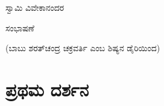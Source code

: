 

\centerline{
{\Large ಸ್ವಾಮಿ ವಿವೇಕಾನಂದರ}
}

\centerline{
{\Large ಸಂಭಾಷಣೆ}
}

\centerline{
{\Large (ಬಾಬು ಶರತ್‌ಚಂದ್ರ ಚಕ್ರವರ್ತಿ ಎಂಬ ಶಿಷ್ಯನ ಡೈರಿಯಿಂದ)}
}

\part{ಪ್ರಥಮ ದರ್ಶನ}

